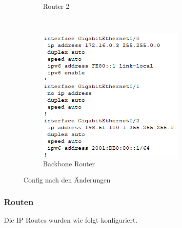 \begin{figure}[!htb]
\begin{subfigure}{.49\textwidth}
        \caption{Router 2}
    \end{subfigure}
    ~
    \begin{subfigure}{.5\textwidth}
        \includegraphics[width=\textwidth,height=.75\textwidth,keepaspectratio]{./ip/bbrouter.png}
        \caption{Backbone Router}
    \end{subfigure}
    \caption{Config nach den Änderungen}
\end{figure}
\FloatBarrier

\subsubsection{Routen}
Die IP Routes wurden wie folgt konfiguriert.
